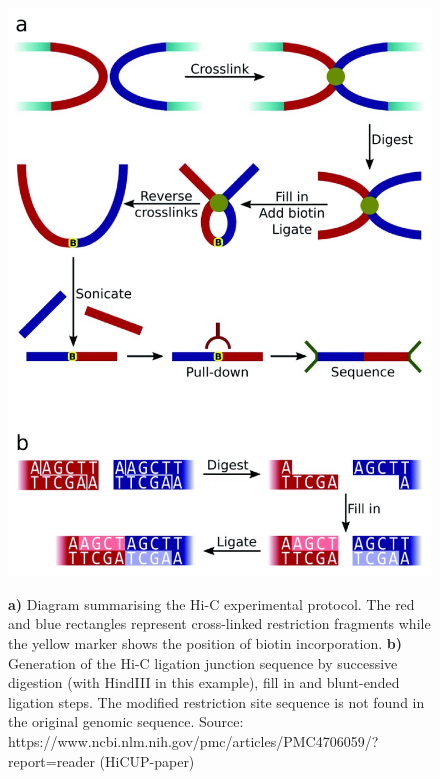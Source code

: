 \begin{figure}[t]
\begin{centering}
    {\includegraphics[scale=4]{figures/background/f1000research-4-7903-g0000.jpg}}
    \caption[Summarised Hi-C protocol]
    {\textbf{a)} Diagram summarising the Hi-C experimental protocol. The red and blue rectangles represent cross-linked restriction fragments while the yellow marker shows the position of biotin incorporation. \textbf{b)} Generation of the Hi-C ligation junction sequence by successive digestion (with HindIII in this example), fill in and blunt-ended ligation steps. The modified restriction site sequence is not found in the original genomic sequence.
    Source: https://www.ncbi.nlm.nih.gov/pmc/articles/PMC4706059/?report=reader (HiCUP-paper)}
    \label{fig:HiC}
\end{centering}
\end{figure}




